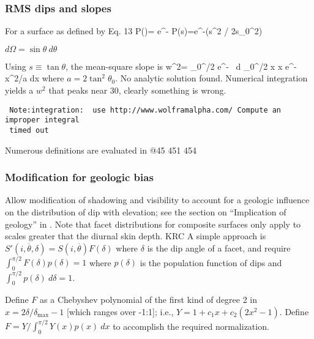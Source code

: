 \documentclass{article}
\begin{document}
\subsubsection{RMS dips and slopes}
For a surface as defined by  Eq. 13
\qb P(\tan \theta)= \cdot e^{- } \leftrightarrow  P(s)=e^{-(s^2 / 2s_0^2)} \qe

$d \Omega = \sin \theta \ d \theta $

Using $s\equiv \tan \theta$, the mean-square slope is 
\qbn w^2= \int _0^{\pi/2} \cdot e^{- }  \sin \theta \ d \theta \Rightarrow {}\int _0^{\pi/2} \sin x \tan x e^{-\tan x^2/a} dx     \qen 
where $a=2 \tan^2 \theta_0$.   No analytic solution found. Numerical integration yields a $w^2$ that peaks near 30\qd, clearly something is wrong.

\begin{verbatim}
 Note:integration:  use http://www.wolframalpha.com/ Compute an improper integral
 timed out
\end{verbatim}  

Numerous definitions are evaluated in  @45 451 454

\subsubsection{Modification for geologic bias} %

Allow modification of shadowing and visibility to account for a geologic influence on the
distribution of dip with elevation; see the section on ``Implication of
geology'' in . Note that facet distributions for composite surfaces only apply to scales greater that the diurnal skin depth. KRC     A simple approach is $
S'(i,\overline{\theta},\delta) = S(i,\overline{\theta}) F(\delta)$ where
$\delta$ is the dip angle of a facet, and require $\int_0^{\pi/2}
F(\delta)p(\delta) =1$ where $p(\delta)$ is the population function of dips and
$\int_0^{\pi/2} p(\delta) \ d\delta =1$.

Define $F$ as a Chebyshev polynomial of the first kind of degree 2 in
$x=2\delta/\delta_\mathrm{max} -1$ [which ranges over -1:1]; i.e.,
$Y=1+c_1x+c_2(2x^2-1)$. Define $F=Y/\int_0^{\pi/2} Y(x)p(x)\ dx $ to accomplish
the required normalization.
\end{document}
